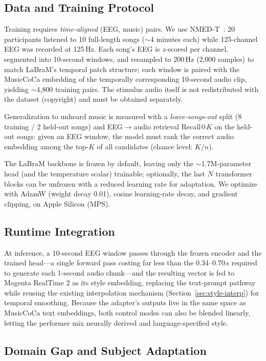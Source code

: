 \documentclass[manuscript,review,anonymous]{acmart}
\begin{document}
\subsection{Data and Training Protocol}

Training requires \emph{time-aligned} (EEG, music) pairs. We use NMED-T~\cite{nmedt}: 20 participants listened to 10 full-length songs ($\sim$4 minutes each) while 125-channel EEG was recorded at 125\,Hz. Each song's EEG is $z$-scored per channel, segmented into 10-second windows, and resampled to 200\,Hz (2,000 samples) to match LaBraM's temporal patch structure; each window is paired with the MusicCoCa embedding of the temporally corresponding 10-second audio clip, yielding $\sim$4,800 training pairs. The stimulus audio itself is not redistributed with the dataset (copyright) and must be obtained separately.

Generalization to unheard music is measured with a \emph{leave-songs-out} split (8 training / 2 held-out songs) and EEG$\to$audio retrieval Recall@$K$ on the held-out songs: given an EEG window, the model must rank the correct audio embedding among the top-$K$ of all candidates (chance level: $K/n$).

The LaBraM backbone is frozen by default, leaving only the $\sim$1.7M-parameter head (and the temperature scalar) trainable; optionally, the last $N$ transformer blocks can be unfrozen with a reduced learning rate for adaptation. We optimize with AdamW (weight decay 0.01), cosine learning-rate decay, and gradient clipping, on Apple Silicon (MPS).

\subsection{Runtime Integration}

At inference, a 10-second EEG window passes through the frozen encoder and the trained head---a single forward pass costing far less than the 0.34--0.70\,s required to generate each 1-second audio chunk---and the resulting vector is fed to Magenta RealTime 2 as its style embedding, replacing the text-prompt pathway while reusing the existing interpolation mechanism (Section~\ref{sec:style-interp}) for temporal smoothing. Because the adapter's outputs live in the same space as MusicCoCa text embeddings, both control modes can also be blended linearly, letting the performer mix neurally derived and language-specified style.

\subsection{Domain Gap and Subject Adaptation}
\end{document}

